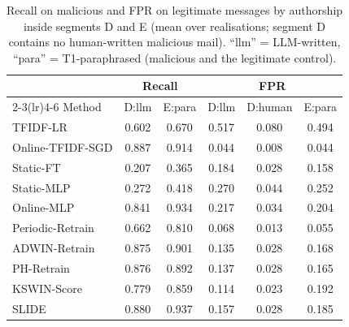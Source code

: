 \begin{table}[t]
\centering
\caption{Recall on malicious and FPR on legitimate messages by authorship inside segments D and E (mean over realisations; segment D contains no human-written malicious mail). ``llm'' = LLM-written, ``para'' = T1-paraphrased (malicious and the legitimate control).}
\label{tab:slices}
\scriptsize
\setlength{\tabcolsep}{2.5pt}
\begin{tabular}{@{}lccccc@{}}
\toprule
 & \multicolumn{2}{c}{Recall} & \multicolumn{3}{c}{FPR} \\
\cmidrule(lr){2-3}\cmidrule(lr){4-6}
Method & D:llm & E:para & D:llm & D:human & E:para \\
\midrule
TFIDF-LR & 0.602 & 0.670 & 0.517 & 0.080 & 0.494 \\
Online-TFIDF-SGD & 0.887 & 0.914 & 0.044 & 0.008 & 0.044 \\
Static-FT & 0.207 & 0.365 & 0.184 & 0.028 & 0.158 \\
Static-MLP & 0.272 & 0.418 & 0.270 & 0.044 & 0.252 \\
Online-MLP & 0.841 & 0.934 & 0.217 & 0.034 & 0.204 \\
Periodic-Retrain & 0.662 & 0.810 & 0.068 & 0.013 & 0.055 \\
ADWIN-Retrain & 0.875 & 0.901 & 0.135 & 0.028 & 0.168 \\
PH-Retrain & 0.876 & 0.892 & 0.137 & 0.028 & 0.165 \\
KSWIN-Score & 0.779 & 0.859 & 0.114 & 0.023 & 0.192 \\
SLIDE & 0.880 & 0.937 & 0.157 & 0.028 & 0.185 \\
\bottomrule
\end{tabular}
\end{table}
